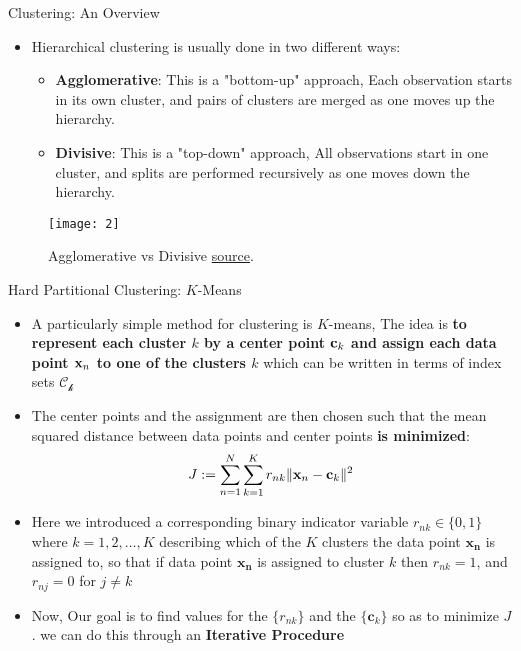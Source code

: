 \documentclass[compress,oilve]{beamer}
\begin{document}
\begin{frame}{Clustering: An Overview}
\begin{itemize}
\item Hierarchical clustering is usually done in two different ways:
	\begin{itemize}
		\item \textbf{Agglomerative}: This is a "bottom-up" approach, Each observation starts in its own cluster, and pairs of clusters are merged as one moves up the hierarchy.
		\item \textbf{Divisive}: This is a "top-down" approach, All observations start in one cluster, and splits are performed recursively as one moves down the hierarchy.
	\end{itemize}
\end{itemize}
\begin{figure}
	\centering
	\texttt{[image: 2]}
	\caption{Agglomerative vs Divisive \href{https://quantdare.com/hierarchical-clustering/}{source}.}
\end{figure}
\end{frame}


\begin{frame}{Hard Partitional Clustering: $K$-Means}
\begin{itemize}
\item A particularly simple method for clustering is $K$-means, The idea is \textbf{to represent each cluster $ k $ by a center point $\mathbf{c_{\mathnormal k}} $ and assign each data point $ \mathbf{x_{\mathnormal n}}$ to one of the clusters $ k $} which can be written in terms of index sets $\mathcal{C_{k}}$
\item The center points and the assignment are then chosen such that the mean squared distance between data points and center points \textbf{is minimized}:
$$ J := \displaystyle\sum_{n=1}^{N} \displaystyle\sum_{k=1}^{K} r_{nk} \| \mathbf{x_{\mathnormal n}} -  \mathbf{c_{\mathnormal k}} \| ^ {2} $$
\item Here we introduced a corresponding binary indicator variable $ r_{nk} \in \{0, 1\} $ where $ k = 1, 2, \dots, K $ describing which of the $ K $ clusters the data point $ \mathbf{x_{n}} $ is assigned to, so that if data point  $ \mathbf{x_{n}} $ is assigned to cluster $ k $ then $ r_{nk} = 1$, and $ r_{nj} = 0 $ for $ j \neq k $
\item Now, Our goal is to find values for the $\{r_{nk}\}$ and the $ \{\mathbf c_{k}\}$ so as to minimize $ J $. we can do this through an \textbf{Iterative Procedure}
\end{itemize}
\end{frame}
\end{document}
